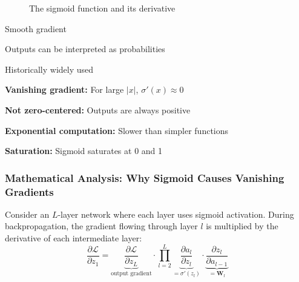 \begin{figure}[htbp]
    \centering
    \caption[Sigmoid function and its derivative]{The sigmoid function and its derivative}
    \label{fig:sigmoid}
\end{figure}

\begin{advantages}
    \item Smooth gradient
    \item Outputs can be interpreted as probabilities
    \item Historically widely used
\end{advantages}

\begin{disadvantages}
    \item \textbf{Vanishing gradient:} For large $|x|$, $\sigma'(x) \approx 0$
    \item \textbf{Not zero-centered:} Outputs are always positive
    \item \textbf{Exponential computation:} Slower than simpler functions
    \item \textbf{Saturation:} Sigmoid saturates at 0 and 1
\end{disadvantages}

\subsubsection{Mathematical Analysis: Why Sigmoid Causes Vanishing Gradients}

Consider an $L$-layer network where each layer uses sigmoid activation. During backpropagation, the gradient flowing through layer $l$ is multiplied by the derivative of each intermediate layer:
\begin{equation}
\frac{\partial \mathcal{L}}{\partial z_1} = \underbrace{\frac{\partial \mathcal{L}}{\partial z_L}}_{\text{output gradient}} \cdot \prod_{l=2}^{L} \underbrace{\frac{\partial a_l}{\partial z_l}}_{= \sigma'(z_l)} \cdot \underbrace{\frac{\partial z_l}{\partial a_{l-1}}}_{= \mathbf{W}_l}
\end{equation}

